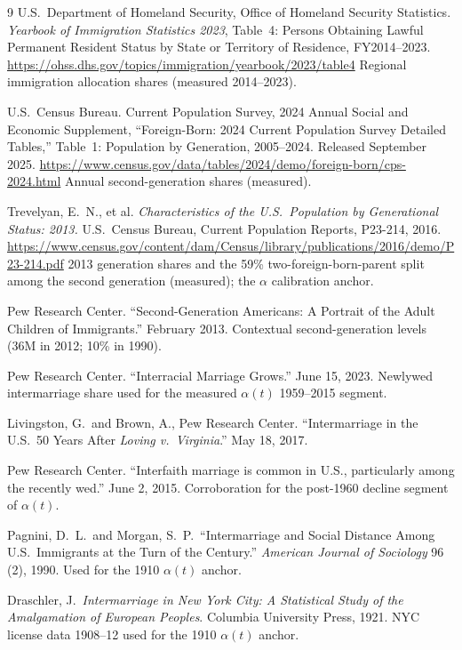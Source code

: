 \documentclass[11pt,a4paper]{article}
\begin{document}
{\begin{thebibliography}{9}
U.S.\ Department of Homeland Security, Office of Homeland Security
Statistics. \textit{Yearbook of Immigration Statistics 2023}, Table~4:
Persons Obtaining Lawful Permanent Resident Status by State or Territory
of Residence, FY2014--2023.
\url{https://ohss.dhs.gov/topics/immigration/yearbook/2023/table4}
Regional immigration allocation shares (measured 2014--2023).

U.S.\ Census Bureau. Current Population Survey, 2024 Annual Social and
Economic Supplement, ``Foreign-Born: 2024 Current Population Survey
Detailed Tables,'' Table~1: Population by Generation, 2005--2024.
Released September 2025.
\url{https://www.census.gov/data/tables/2024/demo/foreign-born/cps-2024.html}
Annual second-generation shares (measured).

Trevelyan, E.~N., et al. \textit{Characteristics of the U.S.\ Population
by Generational Status: 2013.} U.S.\ Census Bureau, Current Population
Reports, P23-214, 2016.
\url{https://www.census.gov/content/dam/Census/library/publications/2016/demo/P23-214.pdf}
2013 generation shares and the 59\% two-foreign-born-parent split among
the second generation (measured); the $\alpha$ calibration anchor.

Pew Research Center. ``Second-Generation Americans: A Portrait of the
Adult Children of Immigrants.'' February 2013.
Contextual second-generation levels (36M in 2012; 10\% in 1990).

Pew Research Center. ``Interracial Marriage Grows.'' June 15, 2023.
Newlywed intermarriage share used for the measured $\alpha(t)$
1959--2015 segment.

Livingston, G.\ and Brown, A., Pew Research Center. ``Intermarriage in
the U.S.\ 50 Years After \textit{Loving v.\ Virginia}.'' May 18, 2017.

Pew Research Center. ``Interfaith marriage is common in U.S.,
particularly among the recently wed.'' June 2, 2015. Corroboration for
the post-1960 decline segment of $\alpha(t)$.

Pagnini, D.\ L.\ and Morgan, S.\ P.\ ``Intermarriage and Social Distance
Among U.S.\ Immigrants at the Turn of the Century.'' \textit{American
Journal of Sociology} 96 (2), 1990. Used for the 1910 $\alpha(t)$
anchor.

Draschler, J.\ \textit{Intermarriage in New York City: A Statistical
Study of the Amalgamation of European Peoples}. Columbia University
Press, 1921. NYC license data 1908--12 used for the 1910
$\alpha(t)$ anchor.


\end{thebibliography}}
\end{document}
